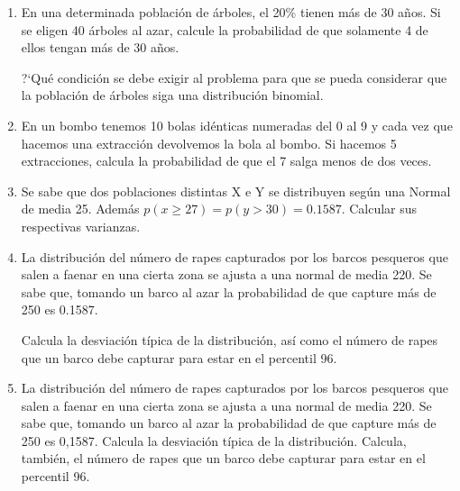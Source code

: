 \begin{adjustwidth}{20pt}{10pt}
\begin{enumerate}[PB. 1. ]
		
		
		\item 	En una determinada población de árboles, el 20\% tienen más de 30 años. Si se eligen 40 árboles al azar, calcule la probabilidad de que solamente 4 de ellos tengan más de 30 años. 
		
		?`Qué condición se debe exigir al problema para que se pueda considerar que la población de árboles siga una distribución binomial.

		
		\hspace{-1cm}\vspace{1cm}
		
		\item 	En un bombo tenemos 10 bolas idénticas numeradas del 0 al 9 y cada vez que hacemos una extracción devolvemos la bola al bombo. Si hacemos 5 extracciones, calcula la probabilidad de que el 7 salga menos de dos veces.

		
		\hspace{-1cm}\vspace{1cm}
		
		
		
		\item 	 Se sabe que dos poblaciones distintas X e Y se distribuyen según una Normal de media 25. Además $p(x\ge 27)=p(y>30)=0.1587$. Calcular sus respectivas varianzas.
		
		\hspace{-1cm}\vspace{1cm}
		
		
		
		\item 	La distribución del número de rapes capturados por los barcos pesqueros que salen a faenar en una cierta zona se ajusta a una normal de media 220. Se sabe que, tomando un barco al azar la probabilidad de que capture más de 250 es 0.1587.

Calcula la desviación típica de la distribución, así como el número de rapes que un barco debe capturar para estar en el percentil 96.
		
		\hspace{-1cm}\vspace{1cm}
		
		\item 	La distribución del número de rapes capturados por los barcos pesqueros que salen a faenar en una cierta zona se ajusta a una normal de media 220. Se sabe que, tomando un barco al azar la probabilidad de que capture más de 250 es 0,1587.
	Calcula la desviación típica de la distribución.
	Calcula, también,  el número de rapes que un barco debe capturar para estar en el percentil 96.
		

\end{enumerate}
\end{adjustwidth}
